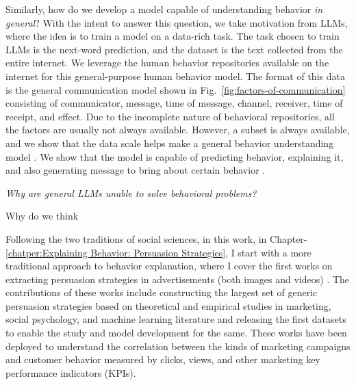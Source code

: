 \documentclass[hidelinks,11pt,a4paper]{report}
\renewcommand{\cite}[1]{\citep{#1}}
\begin{document}
Similarly, how do we develop a model capable of understanding behavior \textit{in general}? With the intent to answer this question, we take motivation from LLMs, where the idea is to train a model on a data-rich task. The task chosen to train LLMs is the next-word prediction, and the dataset is the text collected from the entire internet. We leverage the human behavior repositories available on the internet for this general-purpose human behavior model. The format of this data is the general communication model shown in Fig.~\ref{fig:factors-of-communication} consisting of communicator, message, time of message, channel, receiver, time of receipt, and effect. Due to the incomplete nature of behavioral repositories, all the factors are usually not always available. However, a subset is always available, and we show that the data scale helps make a general behavior understanding model \cite{khandelwal2023large}. We show that the model is capable of predicting behavior, explaining it, and also generating message to bring about certain behavior \cite{khurana2023behavior,si2023long,khandelwal2023large}.



\textit{Why are general LLMs unable to solve behavioral problems?}



Why do we think 



Following the two traditions of social sciences, in this work, in Chapter-\ref{chatper:Explaining Behavior: Persuasion Strategies}, I start with a more traditional approach to behavior explanation, where I cover the first works on extracting persuasion strategies in advertisements (both images and videos) \cite{kumar2023persuasion,bhattacharyya-etal-2023-video}. The contributions of these works include constructing the largest set of generic persuasion strategies based on theoretical and empirical studies in marketing, social psychology, and machine learning literature and releasing the first datasets to enable the study and model development for the same. These works have been deployed to understand the correlation between the kinds of marketing campaigns and customer behavior measured by clicks, views, and other marketing key performance indicators (KPIs). 
\end{document}
